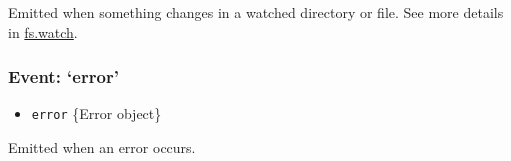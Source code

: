 Emitted when something changes in a watched directory or file. See more
details in
\hyperref[fsux5ffsux5fwatchux5ffilenameux5foptionsux5flistener]{fs.watch}.

\subsubsection{\texorpdfstring{Event:
`error'}{Event: error}}\label{event-error}

\begin{itemize}
\itemsep1pt\parskip0pt
\item
  \texttt{error} \{Error object\}
\end{itemize}

Emitted when an error occurs.
